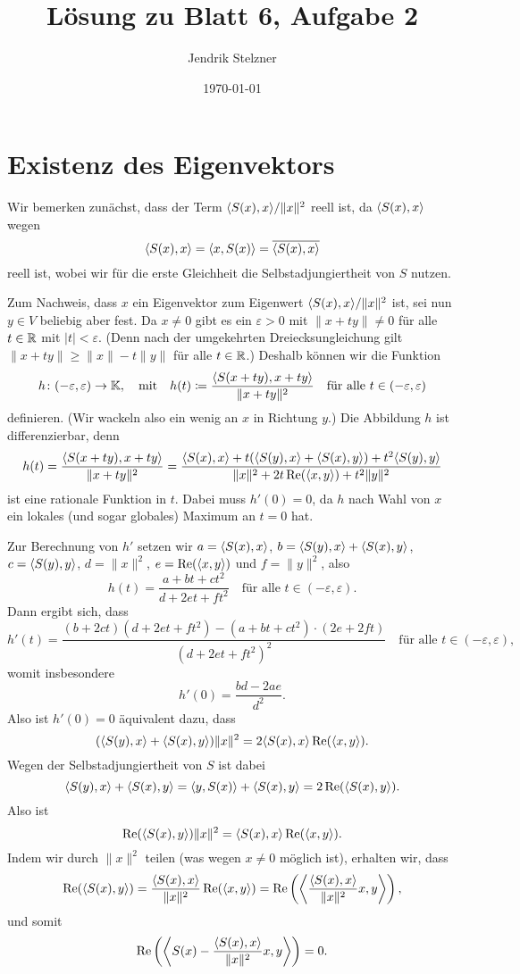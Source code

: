 \documentclass[a4paper,10pt]{scrartcl}
\title{Lösung zu Blatt 6, Aufgabe 2}
\author{Jendrik Stelzner}
\date{\today}
\begin{document}
\maketitle










\section{Existenz des Eigenvektors}


Wir bemerken zunächst, dass der Term $\langle S(x),x \rangle/\|x\|^2$ reell ist, da $\langle S(x), x \rangle$ wegen
\[
    \langle S(x),x \rangle
  = \langle x, S(x) \rangle
  = \overline{\langle S(x), x \rangle}
\]
reell ist, wobei wir für die erste Gleichheit die Selbstadjungiertheit von $S$ nutzen.

Zum Nachweis, dass $x$ ein Eigenvektor zum Eigenwert $\langle S(x),x \rangle/\|x\|^2$ ist, sei nun $y \in V$ beliebig aber fest.
Da $x \neq 0$ gibt es ein $\varepsilon > 0$ mit $\|x+ty\| \neq 0$ für alle $t \in \mathbb{R}$ mit $|t| < \varepsilon$.
(Denn nach der umgekehrten Dreiecksungleichung gilt $\|x+ty\| \geq \|x\| - t \|y\|$ für alle $t \in \mathbb{R}$.)
Deshalb können wir die Funktion
\[
  h \colon (-\varepsilon, \varepsilon) \to \mathbb{K},
  \quad\text{mit}\quad
            h(t)
  \coloneqq \frac{\langle S(x+ty),x+ty \rangle}{\|x+ty\|^2}
  \quad\text{für alle $t \in (-\varepsilon, \varepsilon)$}
\]
definieren.
(Wir wackeln also ein wenig an $x$ in Richtung $y$.)
Die Abbildung $h$ ist differenzierbar, denn
\[
    h(t)
  = \frac{\langle S(x+ty),x+ty \rangle}{\|x+ty\|^2}
  = \frac{\langle S(x),x \rangle + t (\langle S(y),x \rangle + \langle S(x), y \rangle) + t^2 \langle S(y), y \rangle}{\|x\|^2 + 2 t \operatorname{Re}( \langle x,y \rangle ) + t^2 \|y\|^2}
\]
ist eine rationale Funktion in $t$.
Dabei muss $h'(0) = 0$, da $h$ nach Wahl von $x$ ein lokales (und sogar globales) Maximum an $t = 0$ hat.

Zur Berechnung von $h'$ setzen wir $a = \langle S(x), x \rangle$, $b = \langle S(y), x \rangle + \langle S(x), y \rangle$, $c = \langle S(y), y \rangle$, $d = \|x\|^2$, $e = \operatorname{Re}( \langle x,y \rangle)$ und $f = \|y\|^2$, also
\[
  h(t) = \frac{a + b t + c t^2}{d + 2 e t + f t^2}
  \quad
  \text{für alle $t \in (-\varepsilon, \varepsilon)$}.
\]
Dann ergibt sich, dass
\[
  h'(t)
  = \frac{(b + 2 c t)(d + 2 e t + f t^2) - (a + b t + c t^2) \cdot (2 e  + 2 f t)}{(d + 2 e t + f t^2)^2}
  \quad
  \text{für alle $t \in (-\varepsilon, \varepsilon)$},
\]
womit insbesondere
\[
  h'(0) = \frac{b d - 2 a e}{d^2}.
\]
Also ist $h'(0) = 0$ äquivalent dazu, dass
\[
  (\langle S(y), x \rangle + \langle S(x), y \rangle) \|x\|^2 = 2 \langle S(x), x \rangle \operatorname{Re}( \langle x,y \rangle).
\]
Wegen der Selbstadjungiertheit von $S$ ist dabei
\[
    \langle S(y), x \rangle + \langle S(x), y \rangle
  = \langle y, S(x) \rangle + \langle S(x), y \rangle
  = 2 \operatorname{Re}( \langle S(x), y \rangle ).
\]
Also ist
\[
  \operatorname{Re}( \langle S(x), y \rangle ) \|x\|^2 = \langle S(x), x \rangle \operatorname{Re}( \langle x,y \rangle ).
\]
Indem wir durch $\|x\|^2$ teilen (was wegen $x \neq 0$ möglich ist), erhalten wir, dass
\[
    \operatorname{Re}( \langle S(x), y \rangle )
  = \frac{\langle S(x), x \rangle}{\|x\|^2} \operatorname{Re}( \langle x,y \rangle )
  = \operatorname{Re}\left( \left\langle \frac{\langle S(x),x \rangle}{\|x\|^2} x, y \right\rangle \right),
\]
und somit
\[
  \operatorname{Re}\left( \left\langle S(x) - \frac{\langle S(x),x \rangle}{\|x\|^2} x, y \right\rangle \right) = 0.
\]
\end{document}
